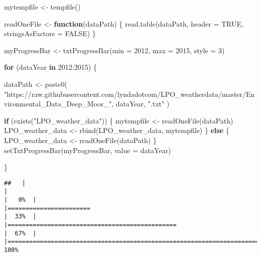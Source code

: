 \documentclass[
  11pt,
]{article}
\newenvironment{Shaded}{\begin{snugshade}}{\end{snugshade}}
\newcommand{\AttributeTok}[1]{\textcolor[rgb]{0.77,0.63,0.00}{#1}}
\newcommand{\ConstantTok}[1]{\textcolor[rgb]{0.00,0.00,0.00}{#1}}
\newcommand{\ControlFlowTok}[1]{\textcolor[rgb]{0.13,0.29,0.53}{\textbf{#1}}}
\newcommand{\DecValTok}[1]{\textcolor[rgb]{0.00,0.00,0.81}{#1}}
\newcommand{\FunctionTok}[1]{\textcolor[rgb]{0.00,0.00,0.00}{#1}}
\newcommand{\NormalTok}[1]{#1}
\newcommand{\OtherTok}[1]{\textcolor[rgb]{0.56,0.35,0.01}{#1}}
\newcommand{\SpecialCharTok}[1]{\textcolor[rgb]{0.00,0.00,0.00}{#1}}
\newcommand{\StringTok}[1]{\textcolor[rgb]{0.31,0.60,0.02}{#1}}
\begin{document}
\begin{Shaded}
\begin{Highlighting}[]
\NormalTok{mytempfile }\OtherTok{\textless{}{-}} \FunctionTok{tempfile}\NormalTok{()}

\NormalTok{readOneFile }\OtherTok{\textless{}{-}} \ControlFlowTok{function}\NormalTok{(dataPath) \{}
  \FunctionTok{read.table}\NormalTok{(dataPath,}
             \AttributeTok{header =} \ConstantTok{TRUE}\NormalTok{,}
             \AttributeTok{stringsAsFactors =} \ConstantTok{FALSE}\NormalTok{)}
\NormalTok{\}}

\NormalTok{myProgressBar }\OtherTok{\textless{}{-}} \FunctionTok{txtProgressBar}\NormalTok{(}\AttributeTok{min =} \DecValTok{2012}\NormalTok{, }\AttributeTok{max =} \DecValTok{2015}\NormalTok{, }\AttributeTok{style =} \DecValTok{3}\NormalTok{)}

\ControlFlowTok{for}\NormalTok{ (dataYear }\ControlFlowTok{in} \DecValTok{2012}\SpecialCharTok{:}\DecValTok{2015}\NormalTok{) \{}
  
\NormalTok{  dataPath }\OtherTok{\textless{}{-}}
    \FunctionTok{paste0}\NormalTok{(}
      \StringTok{"https://raw.githubusercontent.com/lyndadotcom/LPO\_weatherdata/master/Environmental\_Data\_Deep\_Moor\_"}\NormalTok{,}
\NormalTok{      dataYear,}
      \StringTok{".txt"}
\NormalTok{    )}
  
  \ControlFlowTok{if}\NormalTok{ (}\FunctionTok{exists}\NormalTok{(}\StringTok{"LPO\_weather\_data"}\NormalTok{)) \{}
\NormalTok{    mytempfile }\OtherTok{\textless{}{-}} \FunctionTok{readOneFile}\NormalTok{(dataPath)}
\NormalTok{    LPO\_weather\_data }\OtherTok{\textless{}{-}} \FunctionTok{rbind}\NormalTok{(LPO\_weather\_data, mytempfile)}
\NormalTok{  \} }\ControlFlowTok{else}\NormalTok{ \{}
\NormalTok{    LPO\_weather\_data }\OtherTok{\textless{}{-}} \FunctionTok{readOneFile}\NormalTok{(dataPath)}
\NormalTok{  \}}
  \FunctionTok{setTxtProgressBar}\NormalTok{(myProgressBar, }\AttributeTok{value =}\NormalTok{ dataYear)}
  
\NormalTok{\}}
\end{Highlighting}
\end{Shaded}

\begin{verbatim}
##   |                                                                              |                                                                      |   0%  |                                                                              |=======================                                               |  33%  |                                                                              |===============================================                       |  67%  |                                                                              |======================================================================| 100%
\end{verbatim}
\end{document}

